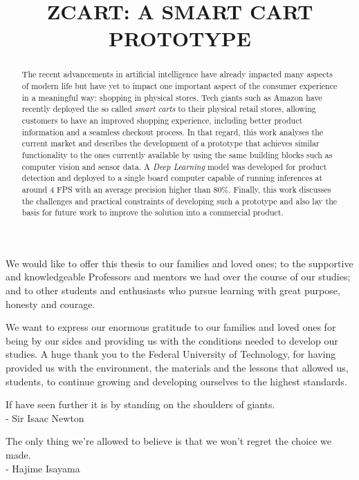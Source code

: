 \documentclass[openright]{normas-utf-tex} %
\title{\MakeUppercase{zCart: A smart cart prototype}} %
\begin{document}
\capa %
\folhaderosto %

\begin{dedicatoria}
We would like to offer this thesis to our families and loved ones;
to the supportive and knowledgeable Professors and mentors we had
over the course of our studies; and to other students and enthusiasts
who pursue learning with great purpose, honesty and courage.
\end{dedicatoria}

\begin{agradecimentos}
We want to express our enormous gratitude to our families and loved ones 
for being by our sides and providing us with the conditions needed to develop our studies.
A huge thank you to the Federal University of Technology, for having
provided us with the environment, the materials and the lessons	that allowed us,
students, to continue growing and developing ourselves to the highest standards.
\end{agradecimentos}

\begin{epigrafe}
 If have seen further it is by standing on the shoulders of giants.  \\
- Sir Isaac Newton

 The only thing we're allowed to believe is that we won't regret the choice we made.  \\
- Hajime Isayama
\end{epigrafe}

\begin{abstract}
The recent advancements in artificial intelligence have already impacted many
aspects of modern life but have yet to impact one important aspect of the
consumer experience in a meaningful way: shopping in physical stores. Tech
giants such as Amazon have recently deployed the so called \textit{smart
carts} to their physical retail stores, allowing customers to have an
improved shopping experience, including better product information and a
seamless checkout process. In that regard, this work analyses the current
market and describes the development of a prototype that achieves similar
functionality to the ones currently available by using the same building
blocks such as computer vision and sensor data. A \textit{Deep Learning}
model was developed for product detection and deployed to a single board
computer capable of running inferences at around 4 FPS with an average
precision higher than  80\%. Finally, this work discusses the challenges and
practical constraints of developing such a prototype and also lay the basis
for future work to improve the solution into a commercial product.
\end{abstract}
\end{document}
